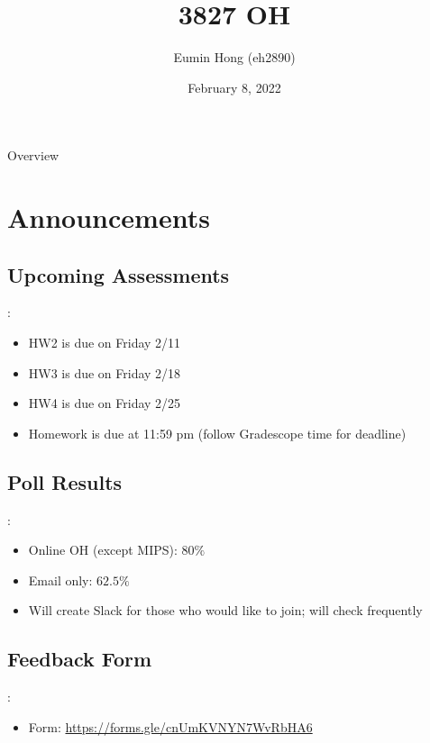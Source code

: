 \documentclass{../slides}
\title{3827 OH}
\author{Eumin Hong (eh2890)}
\institute{Columbia University}
\date{February 8, 2022}
\begin{document}
\begin{frame}
    \titlepage
\end{frame}

\begin{frame}{Overview}
\begin{multicols}{2}
\tableofcontents
\end{multicols}
\end{frame}

\section{Announcements}
\subsection{Upcoming Assessments}
\begin{frame}{\secname: \subsecname}
    \begin{itemize}
        \item HW2 is due on Friday 2/11
        \item HW3 is due on Friday 2/18
        \item HW4 is due on Friday 2/25
        \item Homework is due at 11:59 pm (follow Gradescope time for deadline)
    \end{itemize}
\end{frame}

\subsection{Poll Results}
\begin{frame}{\secname: \subsecname}
    \begin{itemize}
        \item Online OH (except MIPS): $80\%$
        \item Email only: $62.5\%$
        \item Will create Slack for those who would like to join; will check frequently
    \end{itemize}
\end{frame}

\subsection{Feedback Form}
\begin{frame}{\secname: \subsecname}
    \begin{itemize}
        \item Form: \url{https://forms.gle/cnUmKVNYN7WvRbHA6}
    \end{itemize}
\end{frame}
\end{document}
